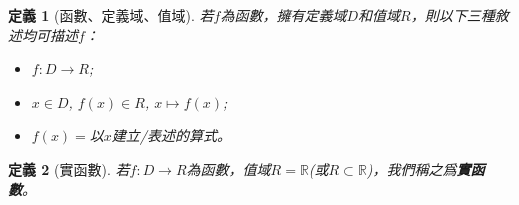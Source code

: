 \documentclass[12pt]{article}
\newtheorem{definition}{定義}
\begin{document}
    \begin{definition}[函數、定義域、值域]
        若$f$為函數，擁有定義域$D$和值域$R$，則以下三種敘述均可描述$f$：\begin{itemize}
            \item $f:D\to R$;
            \item $x\in D$, $f(x)\in R$, $x\mapsto f(x)$;
            \item $f(x)=$以$x$建立/表述的算式。
        \end{itemize}
    \end{definition}

    \begin{definition}[實函數]
        若$f:D\to R$為函數，值域$R=\mathbb{R}$(或$R\subset \mathbb{R}$)，我們稱之爲\textbf{實函數}。
    \end{definition}
\end{document}
